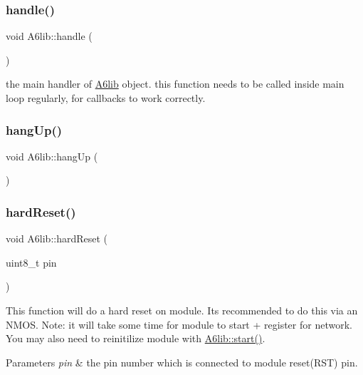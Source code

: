 \subsubsection{\texorpdfstring{handle()}{handle()}}
{\footnotesize\ttfamily void A6lib\+::handle (\begin{DoxyParamCaption}{ }\end{DoxyParamCaption})}

the main handler of \mbox{\hyperlink{class_a6lib}{A6lib}} object. this function needs to be called inside main loop regularly, for callbacks to work correctly. \mbox{\label{class_a6lib_ad5932ea0250881d449d566680a67833e}} 
\subsubsection{\texorpdfstring{hang\+Up()}{hangUp()}}
{\footnotesize\ttfamily void A6lib\+::hang\+Up (\begin{DoxyParamCaption}{ }\end{DoxyParamCaption})}

\mbox{\label{class_a6lib_a7ddb0b59879dcc59290b72a585231ef2}} 
\subsubsection{\texorpdfstring{hard\+Reset()}{hardReset()}}
{\footnotesize\ttfamily void A6lib\+::hard\+Reset (\begin{DoxyParamCaption}\item[{uint8\+\_\+t}]{pin }\end{DoxyParamCaption})}

This function will do a hard reset on module. It\textquotesingle{}s recommended to do this via an N\+M\+OS. Note\+: it will take some time for module to start + register for network. You may also need to reinitilize module with \mbox{\hyperlink{class_a6lib_a4c9b1bef86c734cb57e7962936ecf481}{A6lib\+::start()}}. 
\begin{DoxyParams}{Parameters}
{\em pin} & the pin number which is connected to module reset(\+R\+S\+T) pin. \\
\hline
\end{DoxyParams}
\mbox{\label{class_a6lib_a9503f1167ed6fd225aee3086b827803d}} 
